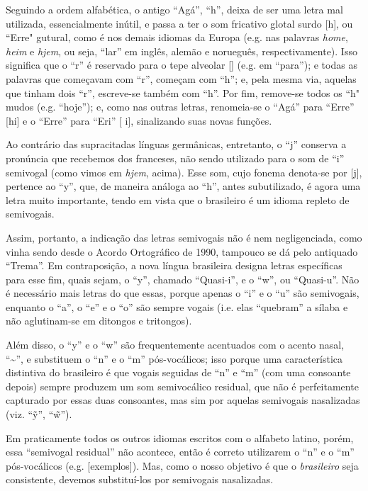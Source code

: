 \documentclass[12pt, a5paper, titlepage]{article}
\begin{document}
\begin{bilingualpages}
    Seguindo a ordem alfabética, o antigo ``Agá'', ``h'', deixa de ser uma letra
    mal utilizada, essencialmente inútil, e passa a ter o som fricativo glotal
    surdo [h], ou ``Erre" gutural, como é nos demais idiomas da Europa (e.g. nas
    palavras \textit{home}, \textit{heim} e \textit{hjem}, ou seja, ``lar'' em
    inglês, alemão e norueguês, respectivamente). Isso significa que o ``r'' é
    reservado para o tepe alveolar [\textfishhookr] (e.g. em ``para''); e todas as
    palavras que começavam com ``r'', começam com ``h''; e, pela mesma via, aquelas
    que tinham dois ``r'', escreve-se também com ``h''. Por fim, remove-se todos os
    ``h" mudos (e.g. ``hoje''); e, como nas outras letras, renomeia-se o ``Agá''
    para ``Erre'' [\textepsilon hi] e o ``Erre'' para ``Eri'' [\textepsilon
    \textfishhookr i], sinalizando suas novas funções.

    Ao contrário das supracitadas línguas germânicas, entretanto, o ``j'' conserva
    a pronúncia que recebemos dos franceses, não sendo utilizado para o som de
    ``i'' semivogal (como vimos em \textit{hjem}, acima). Esse som, cujo fonema
    denota-se por [j], pertence ao ``y'', que, de maneira análoga ao ``h'', antes
    subutilizado, é agora uma letra muito importante, tendo em vista que o
    brasileiro é um idioma repleto de semivogais.

    Assim, portanto, a indicação das letras semivogais não é nem negligenciada,
    como vinha sendo desde o Acordo Ortográfico de 1990, tampouco se dá pelo
    antiquado ``Trema''. Em contraposição, a nova língua brasileira designa letras
    específicas para esse fim, quais sejam, o ``y'', chamado ``Quasi-i'', e o
    ``w'', ou ``Quasi-u''. Não é necessário mais letras do que essas, porque apenas
    o ``i'' e o ``u'' são semivogais, enquanto o ``a'', o ``e'' e o ``o'' são
    sempre vogais (i.e. elas ``quebram'' a sílaba e não aglutinam-se em ditongos e
    tritongos).

    Além disso, o ``y'' e o ``w'' são frequentemente acentuados com o acento nasal,
    ``\textasciitilde'', e substituem o ``n'' e o ``m'' pós-vocálicos; isso porque
    uma característica distintiva do brasileiro é que vogais seguidas de ``n'' e
    ``m'' (com uma consoante depois) sempre produzem um som semivocálico residual,
    que não é perfeitamente capturado por essas duas consoantes, mas sim por
    aquelas semivogais nasalizadas (viz. ``\~y'', ``\~w'').

    Em praticamente todos os outros idiomas escritos com o alfabeto latino, porém,
    essa ``semivogal residual'' não acontece, então é correto utilizarem o ``n'' e
    o ``m'' pós-vocálicos (e.g. [exemplos]). Mas, como o nosso objetivo é que o
    \textit{brasileiro} seja consistente, devemos substituí-los por semivogais
    nasalizadas.


\end{bilingualpages}
\end{document}
